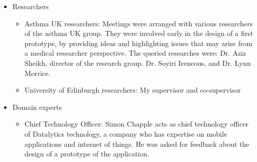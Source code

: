 \begin{itemize}



	\item Researchers 
    \begin{itemize}
      \item Asthma UK researchers: Meetings were arranged with various researchers of the asthma UK group. They were involved early in the design of a first prototype, by providing ideas and highlighting issues that may arise from a medical researcher perspective. The queried researches were:  Dr. Aziz Sheikh, director of the research group. Dr. Soyiri Ireneous, and Dr. Lynn Morrice.

      \item University of Edinburgh researchers: My supervisor and co-supervisor

	\end{itemize}


    
	\item Domain experts    
   \begin{itemize}
      \item Chief Technology Officer: Simon Chapple acts as chief technology officer of Datalytics technology, a company who has expertise on mobile applications and internet of things. He was asked for feedback about the design of a prototype of the application.
	\end{itemize}
    


\end{itemize}
